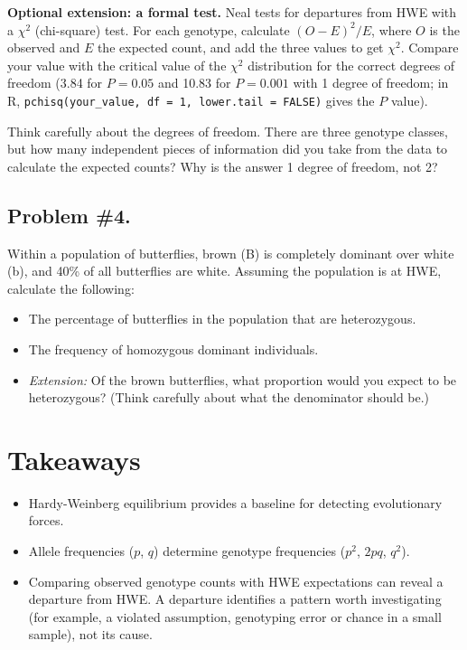 \documentclass[
  a4paper]{book}
\providecommand{\tightlist}{%
  \setlength{\itemsep}{0pt}\setlength{\parskip}{0pt}}
\begin{document}
\textbf{Optional extension: a formal test.} Neal tests for departures from HWE with a \(\chi^2\) (chi-square) test. For each genotype, calculate \((O - E)^2/E\), where \(O\) is the observed and \(E\) the expected count, and add the three values to get \(\chi^2\). Compare your value with the critical value of the \(\chi^2\) distribution for the correct degrees of freedom (3.84 for \(P = 0.05\) and 10.83 for \(P = 0.001\) with 1 degree of freedom; in R, \texttt{pchisq(your\_value,\ df\ =\ 1,\ lower.tail\ =\ FALSE)} gives the \(P\) value).

Think carefully about the degrees of freedom. There are three genotype classes, but how many independent pieces of information did you take from the data to calculate the expected counts? Why is the answer 1 degree of freedom, not 2?

\subsection{Problem \#4.}\label{problem-4.}

Within a population of butterflies, brown (B) is completely dominant over white (b), and 40\% of all butterflies are white. Assuming the population is at HWE, calculate the following:

\begin{itemize}
\tightlist
\item
  The percentage of butterflies in the population that are heterozygous.
\item
  The frequency of homozygous dominant individuals.
\item
  \emph{Extension:} Of the brown butterflies, what proportion would you expect to be heterozygous? (Think carefully about what the denominator should be.)
\end{itemize}

\section{Takeaways}\label{takeaways-14}

\begin{itemize}
\tightlist
\item
  Hardy-Weinberg equilibrium provides a baseline for detecting evolutionary forces.
\item
  Allele frequencies (\(p\), \(q\)) determine genotype frequencies (\(p^2\), \(2pq\), \(q^2\)).
\item
  Comparing observed genotype counts with HWE expectations can reveal a departure from HWE. A departure identifies a pattern worth investigating (for example, a violated assumption, genotyping error or chance in a small sample), not its cause.
\end{itemize}
\end{document}
